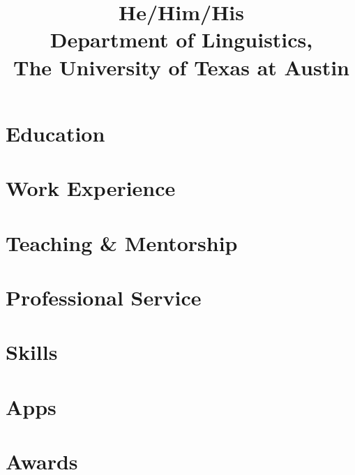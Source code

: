 \documentclass[a4paper]{practical-cv}
\title{He/Him/His\\Department of Linguistics,\\The University of Texas at Austin}
\begin{document}
\makecvtitle

\section{Education}


\printbibliography[title=Publications, nottype=talk]

\printbibliography[title=Talks, type=talk]

\section{Work Experience}


\section{Teaching \& Mentorship}


\section{Professional Service}


\section{Skills}


\section{Apps}


\section{Awards}

\end{document}
